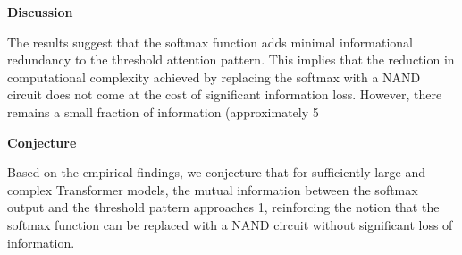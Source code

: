 \textbf{Discussion}













The results suggest that the softmax function adds minimal informational redundancy to the threshold attention pattern. This implies that the reduction in computational complexity achieved by replacing the softmax with a NAND circuit does not come at the cost of significant information loss. However, there remains a small fraction of information (approximately 5%













\textbf{Conjecture}













Based on the empirical findings, we conjecture that for sufficiently large and complex Transformer models, the mutual information between the softmax output and the threshold pattern approaches 1, reinforcing the notion that the softmax function can be replaced with a NAND circuit without significant loss of information.





































